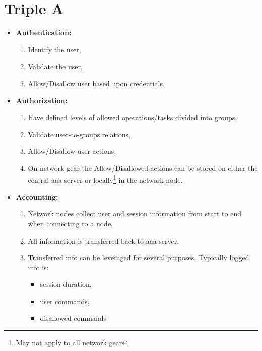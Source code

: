 \chapter{Triple A}



\newpage

\begin{itemize}
    \item \textbf{Authentication:}
    \begin{enumerate}
        \item Identify the user,
        \item Validate the user,
        \item Allow/Disallow user based upon credentials.
    \end{enumerate}
    \item \textbf{Authorization:}
    \begin{enumerate}
        \item Have defined levels of allowed operations/tasks divided into groups,
        \item Validate user-to-groups relations,
        \item Allow/Disallow user actions.
        \item On network gear the Allow/Disallowed actions can be stored on either the central \gls{aaa} server or locally\footnote{May not apply to all network gear} in the network node.
    \end{enumerate}
    \item \textbf{Accounting:}
    \begin{enumerate}
        \item Network nodes collect user and session information from start to end when connecting to a node,
        \item All information is transferred back to \gls{aaa} server,
        \item Transferred info can be leveraged for several purposes. Typically logged info is:
        \begin{itemize}
            \item session duration,
            \item user commands,
            \item disallowed commands
        \end{itemize}
    \end{enumerate}
\end{itemize}

